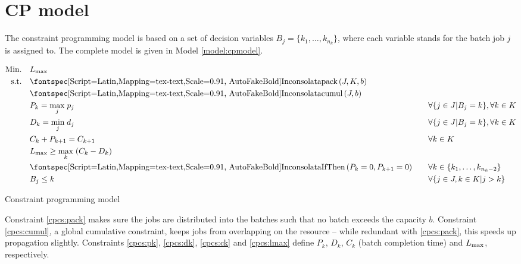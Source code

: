 \section{CP model}
The constraint programming model is based on a set of decision variables $B_j =
\{k_1, \dots, k_{n_k} \}$, where each variable stands for the batch job $j$ is
assigned to. The complete model is given in Model \ref{model:cpmodel}.

\begin{model}

\begin{alignat}{2}
\mathrm{Min.}\quad & \Lmax && \\
\mathrm{s.t.}\quad & \label{cpcs:pack} \mathtt{pack}(J, K, b) && \\
& \label{cpcs:cumul} \mathtt{cumul}(J, b) && \\
& \label{cpcs:pk} P_k = \underset{j}{\max} \; p_j \quad && \forall \{j \in J
| B_j = k\}, \forall k \in K \\
& \label{cpcs:dk} D_k = \underset{j}{\min} \; d_j \quad && \forall \{j \in J
| B_j = k\}, \forall k \in K \\
& \label{cpcs:ck} C_k + P_{k+1} = C_{k+1} \quad && \forall k \in K \\
& \label{cpcs:lmax} \Lmax \geq \underset{k}{\max} \; (C_k - D_k) && \\
& \label{cpcs:empty} \mathtt{IfThen}(P_k = 0, P_{k+1} = 0) \quad && \forall k
\in \{ k_1, \dots, k_{n_k - 2}\} \\
& \label{cpcs:pp} B_j \leq k \quad && \forall \{ j \in J, k \in K | j > k \}
\end{alignat}
\caption{Constraint programming model}
\label{model:cpmodel}
\end{model}

Constraint \eqref{cpcs:pack} makes sure the jobs are distributed into the
batches such that no batch exceeds the capacity $b$. Constraint
\eqref{cpcs:cumul}, a global cumulative constraint, keeps jobs from overlapping
on the resource -- while redundant with \eqref{cpcs:pack}, this speeds up
propagation slightly. Constraints \eqref{cpcs:pk}, \eqref{cpcs:dk},
\eqref{cpcs:ck} and \eqref{cpcs:lmax} define $P_k$, $D_k$, $C_k$ (batch
completion time) and $L_{\text{max}}$, respectively.



